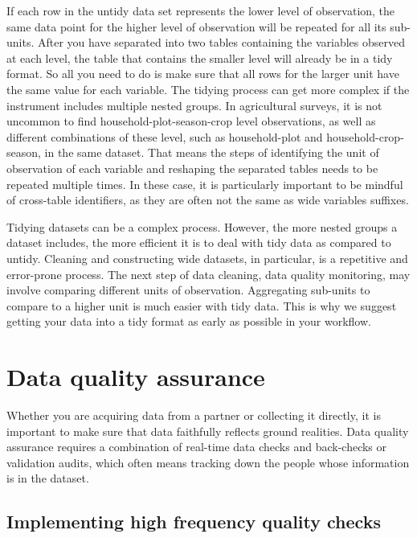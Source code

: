 If each row in the untidy data set represents the lower level of observation,
the same data point for the higher level of observation will be repeated for all its sub-units.
After you have separated into two tables containing the variables observed at each level,
the table that contains the smaller level will already be in a tidy format.
So all you need to do is make sure that all rows for the larger unit have the same value for each variable.
The tidying process can get more complex if the instrument includes multiple nested groups.
In agricultural surveys, it is not uncommon to find household-plot-season-crop level observations,
as well as different combinations of these level,
such as household-plot and household-crop-season, in the same dataset.
That means the steps of identifying the unit of observation of each variable
and reshaping the separated tables needs to be repeated multiple times.
In these case, it is particularly important to be mindful of cross-table identifiers,
as they are often not the same as wide variables suffixes.

Tidying datasets can be a complex process.
However, the more nested groups a dataset includes,
the more efficient it is to deal with tidy data as compared to untidy.
Cleaning and constructing wide datasets, in particular,
is a repetitive and error-prone process.
The next step of data cleaning, data quality monitoring,
may involve comparing different units of observation.
Aggregating sub-units to compare to a higher unit is much easier with tidy data.
This is why we suggest getting your data into a tidy format as early as possible in your workflow. 
 
\section{Data quality assurance}

Whether you are acquiring data from a partner or collecting it directly,
it is important to make sure that data faithfully reflects ground realities.
Data quality assurance requires a combination of real-time data checks
and back-checks or validation audits, which often means tracking down
the people whose information is in the dataset.

\subsection{Implementing high frequency quality checks}

